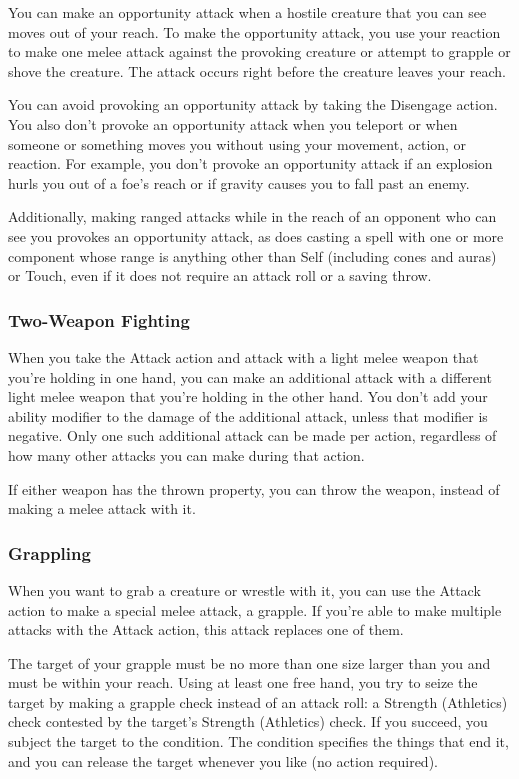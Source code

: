 You can make an opportunity attack when a hostile creature that you can see moves out of your reach. To make the opportunity attack, you use your reaction to make one melee attack against the provoking creature or attempt to grapple or shove the creature. The attack occurs right before the creature leaves your reach.

You can avoid provoking an opportunity attack by taking the Disengage action. You also don't provoke an opportunity attack when you teleport or when someone or something moves you without using your movement, action, or reaction. For example, you don't provoke an opportunity attack if an explosion hurls you out of a foe's reach or if gravity causes you to fall past an enemy.

Additionally, making ranged attacks while in the reach of an opponent who can see you provokes an opportunity attack, as does casting a spell with one or more component whose range is anything other than Self (including cones and auras) or Touch, even if it does not require an attack roll or a saving throw.

\subsubsection{Two-Weapon Fighting}

When you take the Attack action and attack with a light melee weapon that you're holding in one hand, you can make an additional attack with a different light melee weapon that you're holding in the other hand. You don't add your ability modifier to the damage of the additional attack, unless that modifier is negative. Only one such additional attack can be made per action, regardless of how many other attacks you can make during that action.

If either weapon has the thrown property, you can throw the weapon, instead of making a melee attack with it.

\subsubsection{Grappling}

When you want to grab a creature or wrestle with it, you can use the Attack action to make a special melee attack, a grapple. If you're able to make multiple attacks with the Attack action, this attack replaces one of them.

The target of your grapple must be no more than one size larger than you and must be within your reach. Using at least one free hand, you try to seize the target by making a grapple check instead of an attack roll: a Strength (Athletics) check contested by the target's Strength (Athletics) check. If you succeed, you subject the target to the  condition. The condition specifies the things that end it, and you can release the target whenever you like (no action required).

